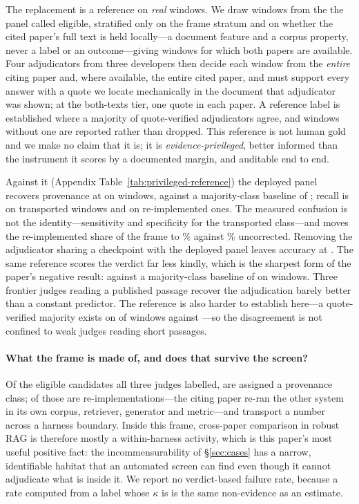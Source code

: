 \documentclass[11pt]{article}
\begin{document}
The replacement is a reference on \emph{real} windows. We draw \PrivN{} windows
from the \PrivPopulation{} the panel called eligible, stratified only on the
frame stratum and on whether the cited paper's full text is held locally---a
document feature and a corpus property, never a label or an outcome---giving
\PrivBoth{} windows for which both papers are available. Four adjudicators from
three developers then decide each window from the \emph{entire} citing paper
and, where available, the entire cited paper, and must support every answer with
a quote we locate mechanically in the document that adjudicator was shown; at
the both-texts tier, one quote in each paper. A reference label is established
where a majority of quote-verified adjudicators agree, and windows without one
are reported rather than dropped. This reference is not human gold and we make
no claim that it is; it is \emph{evidence-privileged}, better informed than the
instrument it scores by a documented margin, and auditable end to end.

Against it (Appendix Table~\ref{tab:privileged-reference}) the deployed panel
recovers provenance at \DepPvAcc{} \DepPvCI{} on \DepPvN{} windows, against a
majority-class baseline of \DepPvBase{}; recall is \RefRecallTrans{} on
transported windows and \RefRecallReimpl{} on re-implemented ones. The measured
confusion is not the identity---sensitivity \RefCorrSens{} and specificity
\RefCorrSpec{} for the transported class---and moves the re-implemented share of
the frame to \RefCorrShare\% against \RecFrameShare\% uncorrected. Removing the
adjudicator sharing a checkpoint with the deployed panel leaves accuracy at
\DepPvAccLoo{}. The same reference scores the verdict far less kindly, which is
the sharpest form of the paper's negative result: \DepVdAcc{} \DepVdCI{} against
a majority-class baseline of \DepVdBase{} on \DepVdN{} windows. Three frontier
judges reading a published passage recover the adjudication barely better than a
constant predictor. The reference is also harder to establish here---a
quote-verified majority exists on \RefVdN{} of \PrivN{} windows against
\RefPvN{}---so the disagreement is not confined to weak judges reading short
passages.

\paragraph{What the frame is made of, and does that survive the screen?}
Of the \ProvCoded{} eligible candidates all three judges labelled,
\ProvClassified{} are assigned a provenance class; \ProvReimplemented{} of those
are re-implementations---the citing paper re-ran the other system in its own
corpus, retriever, generator and metric---and \ProvTransported{} transport a
number across a harness boundary. Inside this frame, cross-paper comparison in
robust RAG is therefore mostly a within-harness activity, which is this paper's
most useful positive fact: the incommensurability of \S\ref{sec:cases} has a
narrow, identifiable habitat that an automated screen can find even though it
cannot adjudicate what is inside it. We report no verdict-based failure rate,
because a rate computed from a label whose $\kappa$ is \DecVerdictK{} is the
same non-evidence as an estimate.
\end{document}
